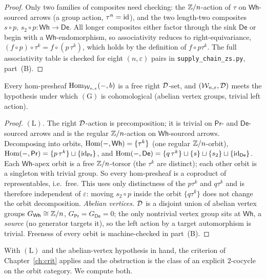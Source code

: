 \begin{proof}
Only two families of composites need checking: the $\mathbb{Z}/n$-action of $\tau$ on
$\mathsf{Wh}$-sourced arrows (a group action, $\tau^n=\mathrm{id}$), and the two
length-two composites $s\circ p,\,s_2\circ p:\mathsf{Wh}\to\mathsf{De}$. All
longer composites either factor through the sink $\mathsf{De}$ or begin with a
$\mathsf{Wh}$-endomorphism, so associativity reduces to right-equivariance,
$(f\circ p)\circ\tau^k=f\circ(p\,\tau^k)$, which holds by the definition of
$f\circ p\tau^k$. The full associativity table is checked for eight
$(n,\varepsilon)$ pairs in \texttt{supply\_chain\_zs.py}, part~(B).
\end{proof}

\begin{lemma}
\label{lem:supply-LH}
Every hom-presheaf $\mathrm{Hom}_{\mathcal W_{n,\varepsilon}}(-,b)$ is a free right
$\mathcal{D}$-set, and $(\mathcal W_{n,\varepsilon},\mathcal{D})$ meets the hypothesis under which
$(\mathrm{G})$ is cohomological (abelian vertex groups, trivial left action).
\end{lemma}

\begin{proof}
\emph{$(\mathrm{L})$.} The right $\mathcal{D}$-action is precomposition; it is trivial on
$\mathsf{Pr}$- and $\mathsf{De}$-sourced arrows and is the regular $\mathbb{Z}/n$-action
on $\mathsf{Wh}$-sourced arrows. Decomposing into orbits,
$\mathrm{Hom}(-,\mathsf{Wh})=\{\tau^k\}$ (one regular $\mathbb{Z}/n$-orbit),
$\mathrm{Hom}(-,\mathsf{Pr})=\{p\,\tau^k\}\sqcup\{\mathrm{id}_{\mathsf{Pr}}\}$, and
$\mathrm{Hom}(-,\mathsf{De})=\{q\,\tau^k\}\sqcup\{s\}\sqcup\{s_2\}\sqcup\{\mathrm{id}_{\mathsf{De}}\}$.
Each $\mathsf{Wh}$-apex orbit is a free $\mathbb{Z}/n$-torsor (the $\tau^k$ are
distinct); each other orbit is a singleton with trivial group. So every
hom-presheaf is a coproduct of representables, i.e.\ free. This uses only
distinctness of the $p\tau^k$ and $q\tau^k$ and is therefore independent of
$\varepsilon$: moving $s_2\circ p$ inside the orbit $\{q\tau^k\}$ does not change
the orbit decomposition. \emph{Abelian vertices.} $\mathcal{D}$ is a disjoint union of
abelian vertex groups $G_{\mathsf{Wh}}\cong\mathbb{Z}/n$,
$G_{\mathsf{Pr}}=G_{\mathsf{De}}=0$; the only nontrivial vertex group sits at
$\mathsf{Wh}$, a \emph{source} (no generator targets it), so the left action by a
target automorphism is trivial. Freeness of every orbit is machine-checked in
part~(B).
\end{proof}

With $(\mathrm{L})$ and the abelian-vertex hypothesis in hand, the criterion of
Chapter~\ref{ch:crit} applies and the obstruction is the class of an explicit
$2$-cocycle on the orbit category. We compute both.

